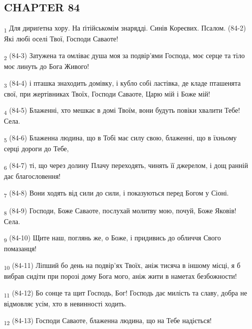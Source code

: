 \subsection{CHAPTER 84}
\begin{tcolorbox}
\textsubscript{1} Для дириґетна хору. На ґітійськомім знарядді. Синів Кореєвих. Псалом. (84-2) Які любі оселі Твої, Господи Саваоте!
\end{tcolorbox}
\begin{tcolorbox}
\textsubscript{2} (84-3) Затужена та омліває душа моя за подвір'ями Господа, моє серце та тіло моє линуть до Бога Живого!
\end{tcolorbox}
\begin{tcolorbox}
\textsubscript{3} (84-4) і пташка знаходить домівку, і кубло собі ластівка, де кладе пташенята свої, при жертівниках Твоїх, Господи Саваоте, Царю мій і Боже мій!
\end{tcolorbox}
\begin{tcolorbox}
\textsubscript{4} (84-5) Блаженні, хто мешкає в домі Твоїм, вони будуть повіки хвалити Тебе! Села.
\end{tcolorbox}
\begin{tcolorbox}
\textsubscript{5} (84-6) Блаженна людина, що в Тобі має силу свою, блаженні, що в їхньому серці дороги до Тебе,
\end{tcolorbox}
\begin{tcolorbox}
\textsubscript{6} (84-7) ті, що через долину Плачу переходять, чинять її джерелом, і дощ ранній дає благословення!
\end{tcolorbox}
\begin{tcolorbox}
\textsubscript{7} (84-8) Вони ходять від сили до сили, і показуються перед Богом у Сіоні.
\end{tcolorbox}
\begin{tcolorbox}
\textsubscript{8} (84-9) Господи, Боже Саваоте, послухай молитву мою, почуй, Боже Яковів! Села.
\end{tcolorbox}
\begin{tcolorbox}
\textsubscript{9} (84-10) Щите наш, поглянь же, о Боже, і придивись до обличчя Свого помазанця!
\end{tcolorbox}
\begin{tcolorbox}
\textsubscript{10} (84-11) Ліпший бо день на подвір'ях Твоїх, аніж тисяча в іншому місці, я б вибрав сидіти при порозі дому Бога мого, аніж жити в наметах безбожности!
\end{tcolorbox}
\begin{tcolorbox}
\textsubscript{11} (84-12) Бо сонце та щит Господь, Бог! Господь дає милість та славу, добра не відмовляє усім, хто в невинності ходить.
\end{tcolorbox}
\begin{tcolorbox}
\textsubscript{12} (84-13) Господи Саваоте, блаженна людина, що на Тебе надіється!
\end{tcolorbox}
